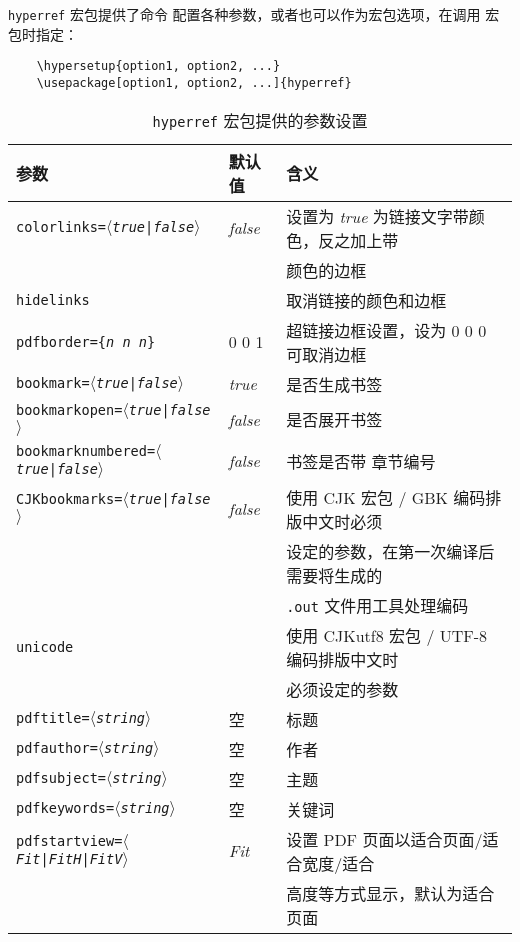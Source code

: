 \documentclass[UTF8]{ctexart}
\begin{document}
\texttt{hyperref} 宏包提供了命令 \texttt{\hypersetup} 配置各种参数，或者也可以作为宏包选项，在调用
宏包时指定：
\begin{verbatim}
    \hypersetup{option1, option2, ...}
    \usepackage[option1, option2, ...]{hyperref}
\end{verbatim}

\begin{table}[H]
\caption{\texttt{hyperref} 宏包提供的参数设置}
\begin{center}
\begin{tabular}{@{}lll@{}}
    \hline
    \textbf{参数} & \textbf{默认值} & \textbf{含义} \\ \hline
    \texttt{colorlinks=$\langle$\emph{true}|\emph{false}$\rangle$} & \emph{false} & 设置为
    \emph{true} 为链接文字带颜色，反之加上带 \\ & & 颜色的边框 \\
    \texttt{hidelinks} & & 取消链接的颜色和边框 \\
    \texttt{pdfborder=\{\emph{n} \emph{n} \emph{n}\}} & 0 0 1 & 超链接边框设置，设为 0 0 0 可取消边框 \\
    \hline
    \texttt{bookmark=$\langle$\emph{true}|\emph{false}$\rangle$} & \emph{true} & 是否生成书签 \\
    \texttt{bookmarkopen=$\langle$\emph{true}|\emph{false}$\rangle$} & \emph{false} & 是否展开书签 \\
    \texttt{bookmarknumbered=$\langle$\emph{true}|\emph{false}$\rangle$} & \emph{false} & 书签是否带
    章节编号 \\
    \texttt{CJKbookmarks=$\langle$\emph{true}|\emph{false}$\rangle$} & \emph{false} & 使用 CJK 宏包 /
    GBK 编码排版中文时必须 \\ & & 设定的参数，在第一次编译后需要将生成的 \\ & & \texttt{.out} 文件用工具处理编码 \\
    \texttt{unicode} & & 使用 CJKutf8 宏包 / UTF-8 编码排版中文时 \\ & & 必须设定的参数 \\ \hline
    \texttt{pdftitle=$\langle$\emph{string}$\rangle$} & 空 & 标题 \\
    \texttt{pdfauthor=$\langle$\emph{string}$\rangle$} & 空 & 作者 \\
    \texttt{pdfsubject=$\langle$\emph{string}$\rangle$} & 空 & 主题 \\
    \texttt{pdfkeywords=$\langle$\emph{string}$\rangle$} & 空 & 关键词 \\
    \texttt{pdfstartview=$\langle$\emph{Fit}|\emph{FitH}|\emph{FitV}$\rangle$} & \emph{Fit} & 设置
    PDF 页面以适合页面/适合宽度/适合 \\ & & 高度等方式显示，默认为适合页面 \\ \hline
\end{tabular}
\end{center}
\end{table}
\end{document}
